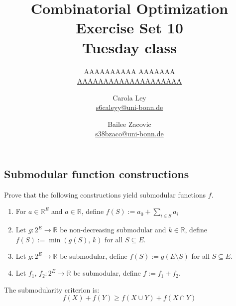 \documentclass{article}
\title{Combinatorial Optimization \\ Exercise Set 10 \\ Tuesday class}
\author{
  AAAAAAAAAA AAAAAAA \\
  \href{mailto:AAAAAAAAAAAAAAAAAAAA}{AAAAAAAAAAAAAAAAAAAA}
  \and
  Carola Ley \\
  \href{mailto:s6caleyy@uni-bonn.de}{s6caleyy@uni-bonn.de}
  \and
  Bailee Zacovic \\
  \href{mailto:s38bzaco@uni-bonn.de}{s38bzaco@uni-bonn.de}
}
\newcommand{\R}{\mathbb{R}}
\begin{document}
  \maketitle

  \setcounter{section}{10}
  \subsection{Submodular function constructions}
  \begin{centerframebox}
    Prove that the following constructions yield submodular functions $f$.

    \begin{enumerate}[label=(\roman*)]
      \item For $a \in \R^E$ and $a \in \R$, define $f(S) := a_0 + \sum_{i\in S} a_i$
      \item Let $g: 2^E \to \R$ be non-decreasing submodular and $k \in \R$, define $f(S) := \min(g(S),\, k)$ for all $S \subseteq E$.
      \item Let $g: 2^E \to \R$ be submodular, define $f(S) := g(E \setminus S)$ for all $S \subseteq E$.
      \item Let $f_1,\, f_2 : 2^E \to \R$ be submodular, define $f := f_1 + f_2$.
    \end{enumerate}
  \end{centerframebox}
  The submodularity criterion is:
  \[ f(X) + f(Y) \geq f(X \cup Y) + f(X \cap Y) \]
\end{document}
